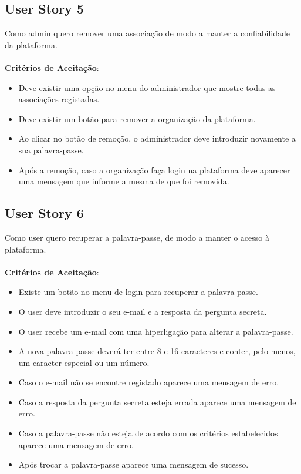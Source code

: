 \documentclass[a4paper,11pt]{article}
\begin{document}
\subsection{User Story 5}
Como admin quero remover uma associação de modo a manter a confiabilidade da plataforma.\\\\
\textbf{Critérios de Aceitação}:
\begin{itemize}
  \item Deve existir uma opção no menu do administrador que mostre todas as associações registadas.
  \item Deve existir um botão para remover a organização da plataforma.
  \item Ao clicar no botão de remoção, o administrador deve introduzir novamente a sua palavra-passe.
  \item Após a remoção, caso a organização faça login na plataforma deve aparecer uma mensagem que informe a mesma de que foi removida.
\end{itemize}

\subsection{User Story 6}
Como user quero recuperar a palavra-passe, de modo a manter o acesso à plataforma.\\\\
\textbf{Critérios de Aceitação}:
\begin{itemize}
  \item Existe um botão no menu de login para recuperar a palavra-passe.
  \item O user deve introduzir o seu e-mail e a resposta da pergunta secreta.
  \item O user recebe um e-mail com uma hiperligação para alterar a palavra-passe.
  \item A nova palavra-passe deverá ter entre 8 e 16 caracteres e conter, pelo menos, um caracter especial ou um número.
  \item Caso o e-mail não se encontre registado aparece uma mensagem de erro.
  \item Caso a resposta da pergunta secreta esteja errada aparece uma mensagem de erro.
  \item Caso a palavra-passe não esteja de acordo com os critérios estabelecidos aparece uma mensagem de erro.
  \item Após trocar a palavra-passe aparece uma mensagem de sucesso.
\end{itemize}
\end{document}
